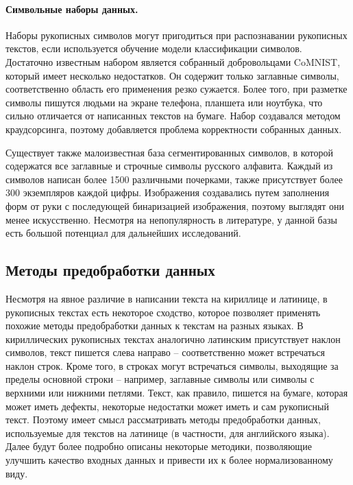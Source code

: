 \paragraph{Символьные наборы данных.}{Наборы рукописных символов могут пригодиться при распознавании рукописных текстов, если используется обучение модели классификации символов.
Достаточно известным набором является собранный добровольцами CoMNIST, который имеет несколько недостатков.
Он содержит только заглавные символы, соответственно область его применения резко сужается.
Более того, при разметке символы пишутся людьми на экране телефона, планшета или ноутбука, что сильно отличается от написанных текстов на бумаге.
Набор создавался методом краудсорсинга, поэтому добавляется проблема корректности собранных данных.

Существует также малоизвестная база сегментированных символов, в которой содержатся все заглавные и строчные символы русского алфавита.
Каждый из символов написан более 1500 различными почерками, также присутствует более 300 экземпляров каждой цифры.
Изображения создавались путем заполнения форм от руки с последующей бинаризацией изображения, поэтому выглядят они менее искусственно.
Несмотря на непопулярность в литературе, у данной базы есть большой потенциал для дальнейших исследований.}


\subsection{Методы предобработки данных}
\label{subsec:preprocessing}

Несмотря на явное различие в написании текста на кириллице и латинице, в рукописных текстах есть некоторое сходство,
которое позволяет применять похожие методы предобработки данных к текстам на разных языках.
В кириллических рукописных текстах аналогично латинским присутствует наклон символов,
текст пишется слева направо -- соответственно может встречаться наклон строк.
Кроме того, в строках могут встречаться символы, выходящие за пределы основной строки --
например, заглавные символы или символы с верхними или нижними петлями.
Текст, как правило, пишется на бумаге, которая может иметь дефекты, некоторые недостатки может иметь и сам рукописный текст.
Поэтому имеет смысл рассматривать методы предобработки данных, используемые для текстов на латинице (в частности, для английского языка).
Далее будут более подробно описаны некоторые методики, позволяющие улучшить качество входных данных и привести их к более нормализованному виду.

